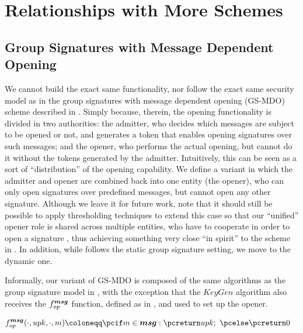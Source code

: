 \section{Relationships with More Schemes}
\label{app:related-extra}

\subsection{Group Signatures with Message Dependent Opening}
\label{sapp:related-models-gsmdo}

We cannot build the exact same functionality, nor follow the exact same security
model as in the group signatures with message dependent opening (GS-MDO) scheme
described in \cite{ehk+19}. Simply because, therein, the opening functionality
is divided in two authorities: the admitter, who decides which messages are
subject to be opened or not, and generates a token that enables opening
signatures over such messages; and the opener, who performs the actual opening,
but cannot do it without the tokens generated by the admitter. Intuitively,
this can be seen as a sort of ``distribution'' of the opening capability. We
define a variant in which the admitter and opener are combined
back into one entity (the opener), who can only open signatures over predefined
messages, but cannot open any other signature.
Although we leave it for future work, note that it should still be possible to
apply thresholding techniques to extend this case so that our ``unified'' opener
role is shared across multiple entities, who have to cooperate in order to open
a signature \cite{cdl+20}, thus achieving something very close ``in spirit'' to
the scheme in \cite{ehk+19}. In addition, while \cite{ehk+19} follows the static
group signature setting, we move to the dynamic one.

Informally, our variant of GS-MDO is composed of the same algorithms as the
group signature model in , with the exception
that the $KeyGen$ algorithm also receives the $f_{op}^{\boldsymbol{msg}}$ function, defined
as in , and used to set up the opener.

\begin{align}
  & \finsp^{\smsg}(\cdot,\upk,\cdot,\msg) \coloneqq
    \pcif \msg \in \smsg: \pcreturn \upk;~\pcelse \pcreturn 0
    \label{eq:finspmsg}
\end{align}


